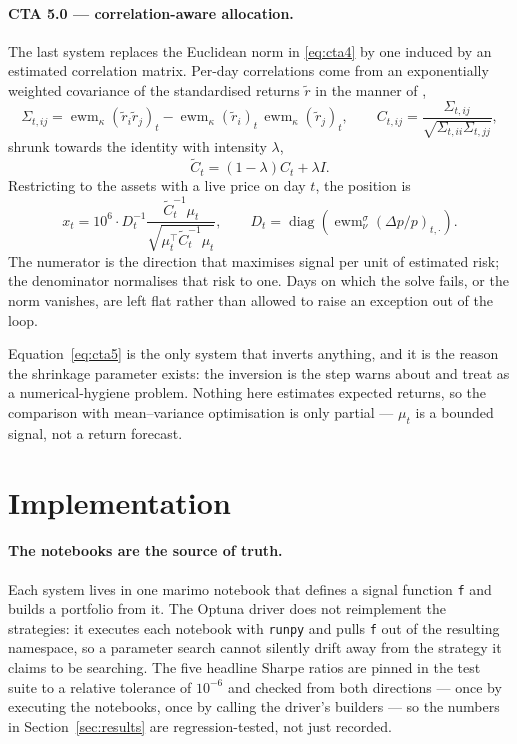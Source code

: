 \documentclass[11pt,a4paper]{article}
\newcommand{\code}[1]{\texttt{#1}}
\DeclareMathOperator{\ewm}{ewm}
\begin{document}
\paragraph{CTA 5.0 --- correlation-aware allocation.}
The last system replaces the Euclidean norm in \eqref{eq:cta4} by one induced
by an estimated correlation matrix. Per-day correlations come from an
exponentially weighted covariance of the standardised returns
$\tilde r$ in the manner of \citet{engle2002},
\begin{equation}
  \Sigma_{t,ij} = \ewm_{\kappa}(\tilde r_i \tilde r_j)_t - \ewm_{\kappa}(\tilde r_i)_t \, \ewm_{\kappa}(\tilde r_j)_t,
  \qquad
  C_{t,ij} = \frac{\Sigma_{t,ij}}{\sqrt{\Sigma_{t,ii} \Sigma_{t,jj}}},
\end{equation}
shrunk towards the identity \citep{ledoit2004} with intensity $\lambda$,
\begin{equation}
  \tilde C_t = (1-\lambda) C_t + \lambda I .
  \label{eq:shrink}
\end{equation}
Restricting to the assets with a live price on day $t$, the position is
\begin{equation}
  x_{t} = 10^{6} \cdot D_t^{-1}
  \frac{\tilde C_t^{-1} \mu_t}{\sqrt{\mu_t^{\top} \tilde C_t^{-1} \mu_t}},
  \qquad
  D_t = \operatorname{diag}\!\left( \ewm^{\sigma}_{\nu}(\Delta p / p)_{t,\cdot} \right).
  \label{eq:cta5}
\end{equation}
The numerator is the direction that maximises signal per unit of estimated
risk; the denominator normalises that risk to one. Days on which the solve
fails, or the norm vanishes, are left flat rather than allowed to raise an
exception out of the loop.

Equation~\eqref{eq:cta5} is the only system that inverts anything, and it is
the reason the shrinkage parameter exists: the inversion is the step
\citet{michaud1989} warns about and \citet{schmelzer2013} treat as a
numerical-hygiene problem. Nothing here estimates expected returns, so the
comparison with mean--variance optimisation \citep{markowitz1952} is only
partial --- $\mu_t$ is a bounded signal, not a return forecast.

\section{Implementation}
\label{sec:impl}

\paragraph{The notebooks are the source of truth.}
Each system lives in one marimo notebook \citep{marimo} that defines a signal
function \code{f} and builds a portfolio from it. The Optuna driver
\citep{akiba2019} does not reimplement the strategies: it executes each
notebook with \code{runpy} and pulls \code{f} out of the resulting namespace,
so a parameter search cannot silently drift away from the strategy it claims
to be searching. The five headline Sharpe ratios are pinned in the test suite
to a relative tolerance of $10^{-6}$ and checked from both directions --- once
by executing the notebooks, once by calling the driver's builders --- so the
numbers in Section~\ref{sec:results} are regression-tested, not just recorded.
\end{document}
